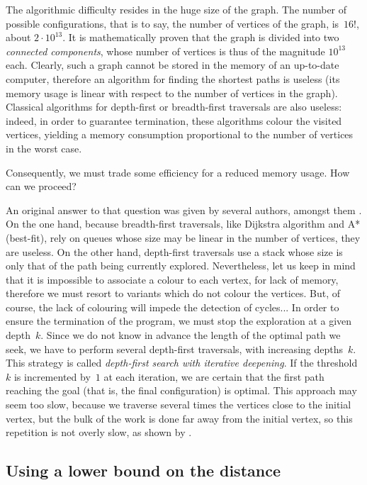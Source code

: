\documentclass[11pt,a4paper]{article}
\begin{document}
The algorithmic difficulty resides in the huge size of the graph. The
number of possible configurations, that is to say, the number of
vertices of the graph, is~\(16!\), about $2 \cdot 10^{13}$. It is
mathematically proven that the graph is divided into two
\emph{connected components}, whose number of vertices is thus of the
magnitude $10^{13}$ each. Clearly, such a graph cannot be stored in
the memory of an up-to-date computer, therefore an algorithm for
finding the shortest paths
\citep{dijkstra-59,cormen,sedgewick-graphs-java} is useless (its
memory usage is linear with respect to the number of vertices in the
graph). Classical algorithms for depth\hyp{}first or
breadth\hyp{}first traversals are also useless: indeed, in order to
guarantee termination, these algorithms colour the visited vertices,
yielding a memory consumption proportional to the number of vertices
in the worst case.

Consequently, we must trade some efficiency for a reduced memory
usage. How can we proceed?

An original answer to that question was given by several authors,
amongst them \cite{korf-85}. On the one hand, because
breadth\hyp{}first traversals, like Dijkstra algorithm and A*
(best\hyp{}fit), rely on queues whose size may be linear in the number
of vertices, they are useless. On the other hand, depth\hyp{}first
traversals use a stack whose size is only that of the path being
currently explored. Nevertheless, let us keep in mind that it is
impossible to associate a colour to each vertex, for lack of memory,
therefore we must resort to variants which do not colour the
vertices. But, of course, the lack of colouring will impede the
detection of cycles... In order to ensure the termination of the
program, we must stop the exploration at a given depth~\(k\). Since we
do not know in advance the length of the optimal path we seek, we have
to perform several depth\hyp{}first traversals, with increasing
depths~\(k\). This strategy is called \emph{depth\hyp{}first search
  with iterative deepening}. If the threshold~\(k\) is incremented
by~\(1\) at each iteration, we are certain that the first path
reaching the goal (that is, the final configuration) is optimal. This
approach may seem too slow, because we traverse several times the
vertices close to the initial vertex, but the bulk of the work is done
far away from the initial vertex, so this repetition is not overly
slow, as shown by \cite{korf-85}.

\subsection{Using a lower bound on the distance}
\end{document}
